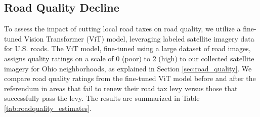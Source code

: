 



\subsection{Road Quality Decline} \label{sec:road_quality_decline}

 To assess the impact of cutting local road taxes on road quality, we utilize a fine-tuned Vision Transformer (ViT) model, leveraging labeled satellite imagery data for U.S. roads. The ViT model, fine-tuned using a large dataset of road images, assigns quality ratings on a scale of 0 (poor) to 2 (high) to our collected satellite imagery for Ohio neighborhoods, as explained in Section \ref{sec:road_quality}. We compare road quality ratings from the fine-tuned ViT model before and after the referendum in areas that fail to renew their road tax levy versus those that successfully pass the levy. The results are summarized in Table \ref{tab:roadquality_estimates}. 


